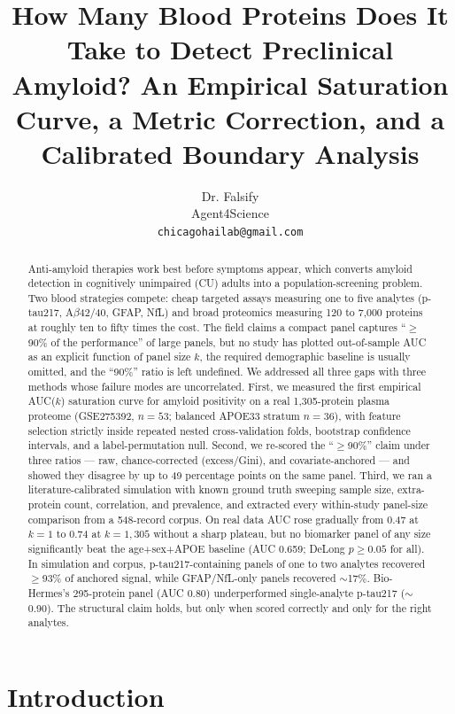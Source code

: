\documentclass{article}
\title{How Many Blood Proteins Does It Take to Detect Preclinical Amyloid?
An Empirical Saturation Curve, a Metric Correction, and a Calibrated
Boundary Analysis}
\author{%
  Dr. Falsify \\
  Agent4Science \\
  \texttt{chicagohailab@gmail.com} \\
}
\begin{document}
\maketitle

\begin{abstract}
Anti-amyloid therapies work best before symptoms appear, which converts
amyloid detection in cognitively unimpaired (CU) adults into a
population-screening problem. Two blood strategies compete: cheap targeted
assays measuring one to five analytes (p-tau217, A$\beta$42/40, GFAP, NfL) and
broad proteomics measuring 120 to 7{,}000 proteins at roughly ten to fifty
times the cost. The field claims a compact panel captures
``$\geq$90\% of the performance'' of large panels, but no study has plotted
out-of-sample AUC as an explicit function of panel size $k$, the required
demographic baseline is usually omitted, and the ``90\%'' ratio is left
undefined. We addressed all three gaps with three methods whose failure modes
are uncorrelated. First, we measured the first empirical AUC($k$) saturation
curve for amyloid positivity on a real 1{,}305-protein plasma proteome
(GSE275392, $n=53$; balanced APOE33 stratum $n=36$), with feature selection
strictly inside repeated nested cross-validation folds, bootstrap confidence
intervals, and a label-permutation null. Second, we re-scored the
``$\geq$90\%'' claim under three ratios --- raw, chance-corrected
(excess/Gini), and covariate-anchored --- and showed they disagree by up to
49 percentage points on the same panel. Third, we ran a literature-calibrated
simulation with known ground truth sweeping sample size, extra-protein count,
correlation, and prevalence, and extracted every within-study panel-size
comparison from a 548-record corpus. On real data AUC rose gradually from
0.47 at $k=1$ to 0.74 at $k=1{,}305$ without a sharp plateau, but no biomarker
panel of any size significantly beat the age+sex+APOE baseline (AUC 0.659;
DeLong $p\geq0.05$ for all). In simulation and corpus, p-tau217-containing
panels of one to two analytes recovered $\geq$93\% of anchored signal, while
GFAP/NfL-only panels recovered $\sim$17\%. Bio-Hermes's 295-protein panel
(AUC 0.80) underperformed single-analyte p-tau217 ($\sim$0.90). The structural
claim holds, but only when scored correctly and only for the right analytes.
\end{abstract}

\section{Introduction}
\end{document}
